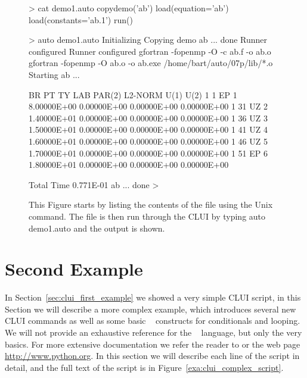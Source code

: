 \documentclass[12pt]{report}
\begin{document}
 \begin{figure}[htb]
 {\small \begin{center} \begin{boxedverbatim}
 > cat demo1.auto
 copydemo('ab')
 load(equation='ab')
 load(constants='ab.1')
 run()

 > auto demo1.auto 
 Initializing
 Copying demo ab ... done
 Runner configured
 Runner configured
 gfortran -fopenmp -O -c ab.f -o ab.o
 gfortran -fopenmp -O ab.o -o ab.exe /home/bart/auto/07p/lib/*.o
 Starting ab ...

   BR    PT  TY  LAB    PAR(2)        L2-NORM         U(1)          U(2)     
    1     1  EP    1   8.00000E+00   0.00000E+00   0.00000E+00   0.00000E+00
    1    31  UZ    2   1.40000E+01   0.00000E+00   0.00000E+00   0.00000E+00
    1    36  UZ    3   1.50000E+01   0.00000E+00   0.00000E+00   0.00000E+00
    1    41  UZ    4   1.60000E+01   0.00000E+00   0.00000E+00   0.00000E+00
    1    46  UZ    5   1.70000E+01   0.00000E+00   0.00000E+00   0.00000E+00
    1    51  EP    6   1.80000E+01   0.00000E+00   0.00000E+00   0.00000E+00

  Total Time    0.771E-01
 ab ... done
 > 
 \end{boxedverbatim}
 \end{center} 
 }
 \caption[Figure of running a simple \AUTO CLUI script.]
 {This Figure starts by listing the contents
 of the  file using the Unix
  command.  The file is then run through
 the \AUTO CLUI by typing {auto demo1.auto} 
 and the output is shown.}
 \label{exa:clui_run_first_script}
 \end{figure}


 \section{ Second Example } \label{sec:clui_complex_example}

 In Section~\ref{sec:clui_first_example} we showed a very simple
 \AUTO CLUI script, in this Section we will describe a more
 complex example, which introduces several new \AUTO CLUI
 commands as well as some basic \python~ constructs for conditionals
 and looping.  We will not provide an exhaustive reference for
 the \python~ language, but only 
 the very basics.  For more extensive documentation we refer the
 reader to  \citeyear{Lut:96} or the
 web page \url{http://www.python.org}.
 In this section we will describe each line of the script
 in detail, and the full text of the script is in
 Figure~\ref{exa:clui_complex_script}.
\end{document}
